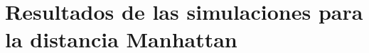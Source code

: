\documentclass[lettersize, journal]{IEEEtran}
\begin{document}

\section{Resultados de las simulaciones para la distancia Manhattan}
\end{document}
